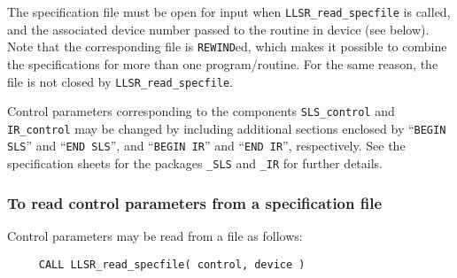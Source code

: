 \documentclass{galahad}
\newcommand{\packagename}{LLSR}
\begin{document}
The specification file must be open for
input when {\tt \packagename\_read\_specfile}
is called, and the associated device number
passed to the routine in device (see below).
Note that the corresponding
file is {\tt REWIND}ed, which makes it possible to combine the specifications
for more than one program/routine.  For the same reason, the file is not
closed by {\tt \packagename\_read\_specfile}.

Control parameters corresponding to the components
{\tt SLS\_control}
and
{\tt IR\_control} may be changed by including additional sections enclosed by
``{\tt BEGIN SLS}'' and
``{\tt END SLS}'', and
``{\tt BEGIN IR}'' and
``{\tt END IR}'', respectively.
See the specification sheets for the packages
{\tt \libraryname\_SLS}
and
{\tt \libraryname\_IR}
for further details.

\subsubsection{To read control parameters from a specification file}
\label{readspec}

Control parameters may be read from a file as follows:
\hskip0.5in
\def\baselinestretch{0.8} {\tt \begin{verbatim}
     CALL LLSR_read_specfile( control, device )
\end{verbatim}}
\def\baselinestretch{1.0}
\end{document}
